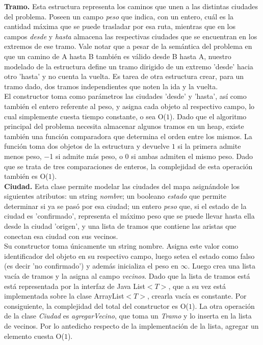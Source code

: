 \textbf{Tramo.} Esta estructura representa los caminos que unen a las distintas ciudades del problema. Poseen un campo \textsl{peso} que indica, con un entero, cuál es la cantidad máxima que se puede trasladar por esa ruta, mientras que en los campos \textsl{desde} y \textsl{hasta} almacena las respectivas ciudades que se encuentran en los extremos de ese tramo. Vale notar que a pesar de la semántica del problema en que un camino de A hasta B también es válido desde B hasta A, nuestro modelado de la estructura define un tramo dirigido de un extremo 'desde' hacia otro 'hasta' y no cuenta la vuelta. Es tarea de otra estructura crear, para un tramo dado, dos tramos independientes que noten la ida y la vuelta.\\
\indent El constructor toma como parámetros las ciudades 'desde' y 'hasta', así como también el entero referente al peso, y asigna cada objeto al respectivo campo, lo cual simplemente cuesta tiempo constante, o sea O($1$). Dado que el algoritmo principal del problema necesita almacenar algunos tramos en un heap, existe también una función comparadora que determina el orden entre los mismos. La función toma dos objetos de la estructura y devuelve $1$ si la primera admite menos peso, $-$1 si admite más peso, o $0$ si ambas admiten el mismo peso. Dado que se trata de tres comparaciones de enteros, la complejidad de esta operación también es O($1$).\\
\indent \textbf{Ciudad.} Esta clase permite modelar las ciudades del mapa asignándole los siguientes atributos: un string \textsl{nombre}; un booleano \textsl{estado} que permite determinar si ya se pasó por esa ciudad; un entero \textsl{peso} que, si el estado de la ciudad es 'confirmado', representa el máximo peso que se puede llevar hasta ella desde la ciudad 'origen', y una lista de tramos que contiene las aristas que conectan esa ciudad con sus vecinos. \\
\indent Su constructor toma únicamente un string nombre. Asigna este valor como identificador del objeto en su respectivo campo, luego setea el estado como falso (es decir 'no confirmado') y además inicializa el peso en  $\infty$. Luego crea una lista vacía de tramos y la asigna al campo \textsl{vecinos}. Dado que la lista de tramos está está representada por la interfaz de Java List$<T>$, que a su vez está implementada sobre la clase ArrayList$<T>$, crearla vacía es constante. Por consiguiente, la complejidad del total del constructor es O($1$). La otra operación de la clase \textsl{Ciudad} es \textsl{agregarVecino}, que toma un \textsl{Tramo} y lo inserta en la lista de vecinos. Por lo antedicho respecto de la implementación de la lista, agregar un elemento cuesta O($1$).\\

